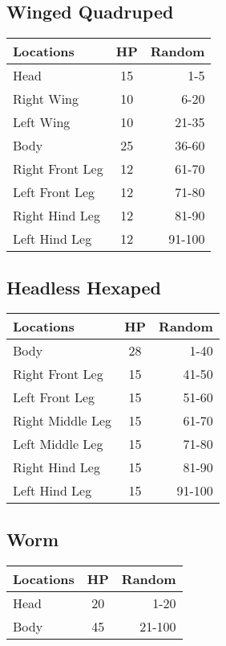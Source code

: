 \begin{multicols}{2}
\subsection{Winged Quadruped}
\begin{minipage}{\columnwidth}
	\begin{tabularx}{\columnwidth}{|X|c|r|}
		\hline
		Locations       & HP & Random \\ \hline
		Head            & 15 &    1-5 \\ \hline
		Right Wing      & 10 &   6-20 \\ \hline
		Left Wing       & 10 &  21-35 \\ \hline
		Body            & 25 &  36-60 \\ \hline
		Right Front Leg & 12 &  61-70 \\ \hline
		Left Front Leg  & 12 &  71-80 \\ \hline
		Right Hind Leg  & 12 &  81-90 \\ \hline
		Left Hind Leg   & 12 & 91-100 \\ \hline
	\end{tabularx}
\end{minipage}

\subsection{Headless Hexaped}
\begin{minipage}{\columnwidth}
	\begin{tabularx}{\columnwidth}{|X|c|r|}
		\hline
		Locations        & HP & Random \\ \hline
		Body             & 28 &   1-40 \\ \hline
		Right Front Leg  & 15 &  41-50 \\ \hline
		Left Front Leg   & 15 &  51-60 \\ \hline
		Right Middle Leg & 15 &  61-70 \\ \hline
		Left Middle Leg  & 15 &  71-80 \\ \hline
		Right Hind Leg   & 15 &  81-90 \\ \hline
		Left Hind Leg    & 15 & 91-100 \\ \hline
	\end{tabularx}
\end{minipage}

\subsection{Worm}
\begin{minipage}{\columnwidth}
	\begin{tabularx}{\columnwidth}{|X|c|r|}
		\hline
		Locations & HP & Random \\ \hline
		Head      & 20 &   1-20 \\ \hline
		Body      & 45 & 21-100 \\ \hline
	\end{tabularx}
\end{minipage}


\end{multicols}

